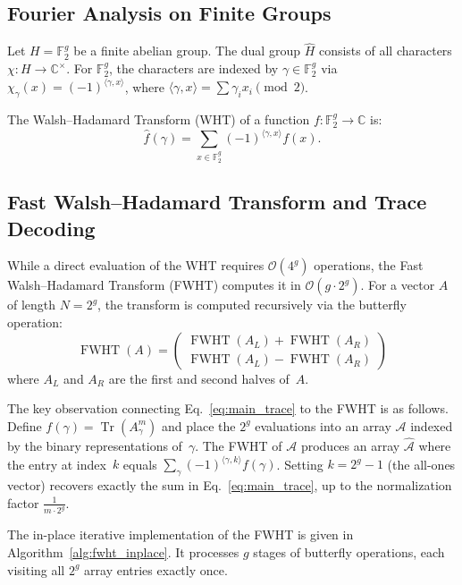\documentclass[acmsmall,review]{acmart}
\newcommand{\bigO}{\mathcal{O}}
\newcommand{\F}{\mathbb{F}_2}
\newcommand{\C}{\mathbb{C}}
\newcommand{\inner}[2]{\langle #1, #2 \rangle}
\DeclareMathOperator{\Tr}{Tr}
\begin{document}
	\subsection{Fourier Analysis on Finite Groups}
	Let $H = \F^g$ be a finite abelian group. The dual group $\widehat{H}$ consists of all characters $\chi: H \to \C^\times$. For $\F^g$, the characters are indexed by $\gamma \in \F^g$ via $\chi_\gamma(x) = (-1)^{\inner{\gamma}{x}}$, where $\inner{\gamma}{x} = \sum \gamma_i x_i \pmod 2$.
	
	\begin{definition}
		The Walsh--Hadamard Transform (WHT) of a function $f: \F^g \to \C$ is:
		\[ \widehat{f}(\gamma) = \sum_{x \in \F^g} (-1)^{\inner{\gamma}{x}} f(x). \]
	\end{definition}
	
	\subsection{Fast Walsh--Hadamard Transform and Trace Decoding}
	\label{sec:fwht_decoding}
	While a direct evaluation of the WHT requires $\bigO(4^g)$ operations, the Fast Walsh--Hadamard Transform (FWHT) computes it in $\bigO(g \cdot 2^g)$. For a vector $A$ of length $N=2^g$, the transform is computed recursively via the butterfly operation:
	\begin{equation} \label{eq:fwht_recursive}
		\operatorname{FWHT}(A) = \begin{pmatrix} \operatorname{FWHT}(A_L) + \operatorname{FWHT}(A_R) \\ \operatorname{FWHT}(A_L) - \operatorname{FWHT}(A_R) \end{pmatrix}
	\end{equation}
	where $A_L$ and $A_R$ are the first and second halves of~$A$.
	
	The key observation connecting Eq.~\eqref{eq:main_trace} to the FWHT is as follows. Define $f(\gamma) = \Tr(A_{\gamma}^m)$ and place the $2^g$ evaluations into an array $\mathcal{A}$ indexed by the binary representations of~$\gamma$. The FWHT of $\mathcal{A}$ produces an array $\widehat{\mathcal{A}}$ where the entry at index~$k$ equals $\sum_{\gamma} (-1)^{\langle \gamma, k \rangle} f(\gamma)$. Setting $k = 2^g - 1$ (the all-ones vector) recovers exactly the sum in Eq.~\eqref{eq:main_trace}, up to the normalization factor $\frac{1}{m \cdot 2^g}$.

	The in-place iterative implementation of the FWHT is given in Algorithm~\ref{alg:fwht_inplace}. It processes $g$ stages of butterfly operations, each visiting all $2^g$ array entries exactly once.
\end{document}
